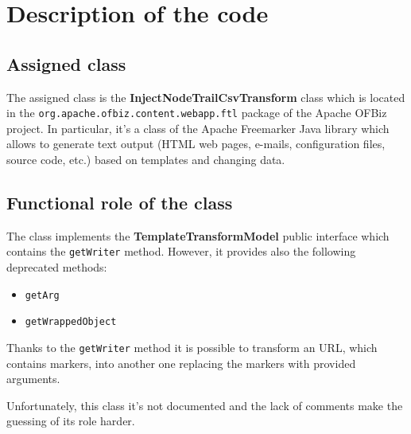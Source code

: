 \section{Description of the code}

\subsection {Assigned class}

The assigned class is the \textbf{InjectNodeTrailCsvTransform} class which is located in the \texttt{org.apache.ofbiz.content.webapp.ftl} package of the Apache OFBiz project. In particular, it's a class of the Apache Freemarker Java library which allows to generate text output (HTML web pages, e-mails, configuration files, source code, etc.) based on templates and changing data.

\subsection {Functional role of the class}

The class implements the \textbf{TemplateTransformModel} public interface which contains the \texttt{getWriter} method. However, it provides also the following deprecated methods:

\begin{itemize}
	\item \texttt{getArg}
	\item \texttt{getWrappedObject}
\end{itemize}
Thanks to the \texttt{getWriter} method it is possible to transform an URL, which contains markers, into another one replacing the markers with provided arguments. 

Unfortunately, this class it's not documented and the lack of comments make the guessing of its role harder.
